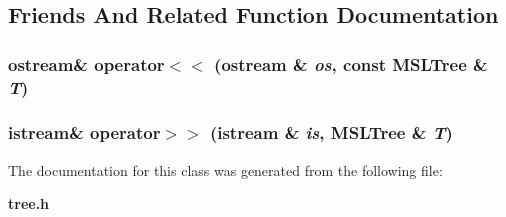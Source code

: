 \subsection{Friends And Related Function Documentation}
\subsubsection{\setlength{\rightskip}{0pt plus 5cm}ostream\& operator$<$$<$ (ostream \& {\em os}, const MSLTree \& {\em T})\hspace{0.3cm}{\tt  [friend]}}\label{class_MSLTree_l1}


\subsubsection{\setlength{\rightskip}{0pt plus 5cm}istream\& operator$>$$>$ (istream \& {\em is}, MSLTree \& {\em T})\hspace{0.3cm}{\tt  [friend]}}\label{class_MSLTree_l0}




The documentation for this class was generated from the following file:\begin{CompactItemize}
\item 
{\bf tree.h}\end{CompactItemize}
